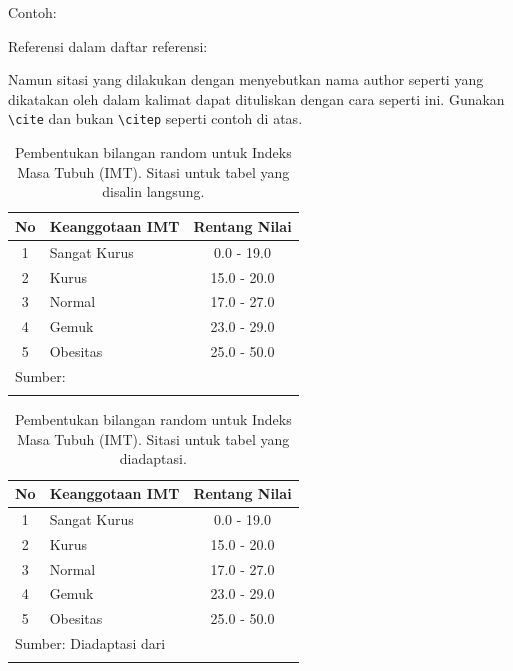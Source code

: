 Contoh:

Referensi dalam daftar referensi:

\begin{displayquote}
\end{displayquote}

Namun sitasi yang dilakukan dengan menyebutkan nama author seperti yang dikatakan oleh \cite{Bloggs1950} dalam kalimat dapat dituliskan dengan cara seperti ini. Gunakan \verb_\cite_ dan bukan \verb_\citep_ seperti contoh di atas.

\begin{table}
  \centering
  \renewcommand{\arraystretch}{1.2}
  \caption{Pembentukan bilangan random untuk Indeks Masa Tubuh (IMT). Sitasi untuk tabel yang disalin langsung.}
  \begin{tabular}{clc}
    \hline
    No & Keanggotaan IMT & Rentang Nilai \\
    \hline
    1 & Sangat Kurus & 0.0 - 19.0 \\
    2 & Kurus & 15.0 - 20.0 \\
    3 & Normal & 17.0 - 27.0 \\
    4 & Gemuk & 23.0 - 29.0 \\
    5 & Obesitas & 25.0 - 50.0 \\
    \hline
    \multicolumn{2}{l}{\footnotesize{Sumber: \cite{anggariawan:2014}}} \\
    \label{tab:judulpanjangjuga}
  \end{tabular}
\end{table}




\begin{table}
  \centering
  \renewcommand{\arraystretch}{1.2}
  \caption{Pembentukan bilangan random untuk Indeks Masa Tubuh (IMT). Sitasi untuk tabel yang diadaptasi.}
  \begin{tabular}{clc}
    \hline
    No & Keanggotaan IMT & Rentang Nilai \\
    \hline
    1 & Sangat Kurus & 0.0 - 19.0 \\
    2 & Kurus & 15.0 - 20.0 \\
    3 & Normal & 17.0 - 27.0 \\
    4 & Gemuk & 23.0 - 29.0 \\
    5 & Obesitas & 25.0 - 50.0 \\
    \hline
    \multicolumn{3}{l}{\footnotesize{Sumber: Diadaptasi dari \cite{anggariawan:2014}}} \\
    \label{tab:judulpanjang}
  \end{tabular}
\end{table}

